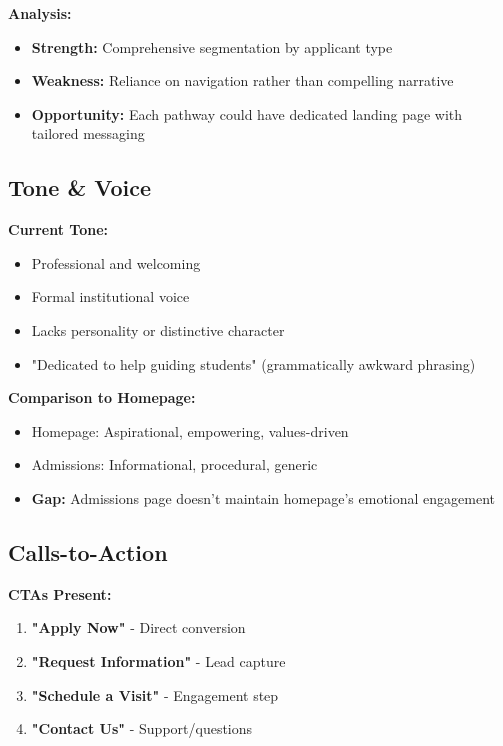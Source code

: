 \documentclass[12pt,letterpaper]{article}
\begin{document}
\textbf{Analysis:}
\begin{itemize}[leftmargin=*]
    \item \textbf{Strength:} Comprehensive segmentation by applicant type
    \item \textbf{Weakness:} Reliance on navigation rather than compelling narrative
    \item \textbf{Opportunity:} Each pathway could have dedicated landing page with tailored messaging
\end{itemize}

\subsection{Tone \& Voice}

\textbf{Current Tone:}
\begin{itemize}[leftmargin=*]
    \item Professional and welcoming
    \item Formal institutional voice
    \item Lacks personality or distinctive character
    \item "Dedicated to help guiding students" (grammatically awkward phrasing)
\end{itemize}

\textbf{Comparison to Homepage:}
\begin{itemize}[leftmargin=*]
    \item Homepage: Aspirational, empowering, values-driven
    \item Admissions: Informational, procedural, generic
    \item \textbf{Gap:} Admissions page doesn't maintain homepage's emotional engagement
\end{itemize}

\subsection{Calls-to-Action}

\textbf{CTAs Present:}
\begin{enumerate}[leftmargin=*]
    \item \textbf{"Apply Now"} - Direct conversion
    \item \textbf{"Request Information"} - Lead capture
    \item \textbf{"Schedule a Visit"} - Engagement step
    \item \textbf{"Contact Us"} - Support/questions
\end{enumerate}
\end{document}
